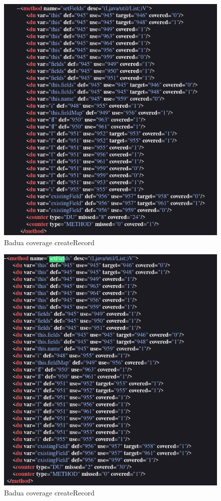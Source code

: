 \documentclass[10pt, a4paper]{article}
\begin{document}
  \begin{figure}
    \includegraphics[width=\linewidth]{./images/create_record/BaduaCoverage1.png}
    \caption{Badua coverage createRecord}
    \label{fig:BaduaCoverageCreateRecord1}
  \end{figure}

  \begin{figure}
    \includegraphics[width=\linewidth]{./images/create_record/BaduaCoverage2.png}
    \caption{Badua coverage createRecord}
    \label{fig:BaduaCoverageCreateRecord2}
  \end{figure}
\end{document}
